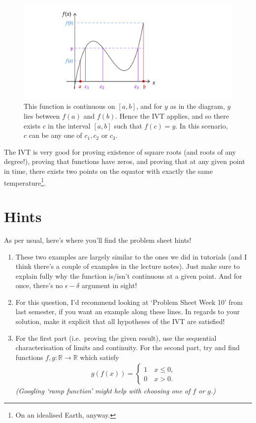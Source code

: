\documentclass[
  10pt,
  a4paper]{article}
\providecommand{\tightlist}{%
  \setlength{\itemsep}{0pt}\setlength{\parskip}{0pt}}
\theoremstyle{plain}
\theoremstyle{definition}
\theoremstyle{plain}
\theoremstyle{plain}
\theoremstyle{plain}
\theoremstyle{plain}
\theoremstyle{definition}
\theoremstyle{definition}
\theoremstyle{remark}
\theoremstyle{remark}
\begin{document}
\begin{figure}
\includegraphics{ivt} \caption{This function is continuous on $[a,b]$, and for $y$ as in the diagram, $y$ lies between $f(a)$ and $f(b)$. Hence the IVT applies, and so there exists $c$ in the interval $[a,b]$ such that $f(c)=y$. In this scenario, $c$ can be any one of $c_1,c_2$ or $c_3$.}\label{fig:ivt}
\end{figure}

The IVT is very good for proving existence of square roots (and roots of any degree!), proving that functions have zeros, and proving that at any given point in time, there exists two points on the equator with exactly the same temperature\footnote{On an idealised Earth, anyway.}.

\hypertarget{hints}{%
\section{Hints}\label{hints}}

As per usual, here's where you'll find the problem sheet hints!

\begin{enumerate}
\def\labelenumi{\arabic{enumi})}
\tightlist
\item
  These two examples are largely similar to the ones we did in tutorials (and I think there's a couple of examples in the lecture notes). Just make sure to explain fully why the function is/isn't continuous at a given point. And for once, there's no \(\epsilon-\delta\) argument in sight!
\item
  For this question, I'd recommend looking at `Problem Sheet Week 10' from last semester, if you want an example along these lines. In regards to your solution, make it explicit that all hypotheses of the IVT are satisfied!
\item
  For the first part (i.e.~proving the given result), use the sequential characterisation of limits and continuity. For the second part, try and find functions \(f,g: \mathbb{R} \to \mathbb{R}\) which satisfy
  \begin{align*}
  g(f(x)) = \begin{cases}
  1 \quad x\leq 0,\\
  0 \quad x > 0.
  \end{cases}
  \end{align*}
  \emph{(Googling `ramp function' might help with choosing one of \(f\) or \(g\).)}
\end{enumerate}
\end{document}
